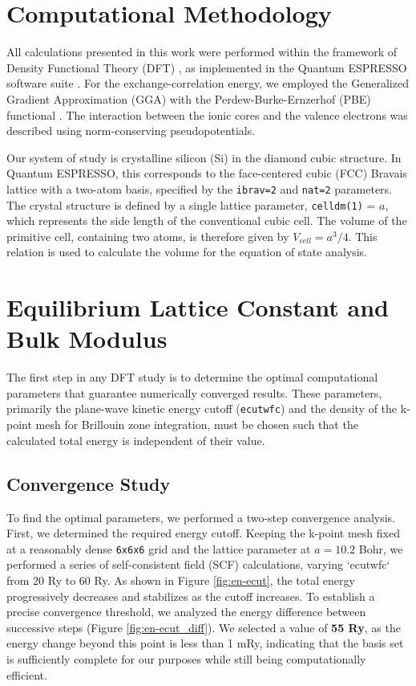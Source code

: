 \documentclass{article}
\begin{document}
\section{Computational Methodology}

All calculations presented in this work were performed within the framework of Density Functional Theory (DFT) \cite{hohenberg_kohn_1964, kohn_sham_1965}, as implemented in the Quantum ESPRESSO software suite \cite{qe_2009, qe_2017}. For the exchange-correlation energy, we employed the Generalized Gradient Approximation (GGA) with the Perdew-Burke-Ernzerhof (PBE) functional \cite{pbe_1996}. The interaction between the ionic cores and the valence electrons was described using norm-conserving pseudopotentials.

Our system of study is crystalline silicon (Si) in the diamond cubic structure. In Quantum ESPRESSO, this corresponds to the face-centered cubic (FCC) Bravais lattice with a two-atom basis, specified by the \verb|ibrav=2| and \verb|nat=2| parameters. The crystal structure is defined by a single lattice parameter, \verb|celldm(1)| = $a$, which represents the side length of the conventional cubic cell. The volume of the primitive cell, containing two atoms, is therefore given by $V_{cell} = a^3/4$. This relation is used to calculate the volume for the equation of state analysis.

\section{Equilibrium Lattice Constant and Bulk Modulus}

The first step in any DFT study is to determine the optimal computational parameters that guarantee numerically converged results. These parameters, primarily the plane-wave kinetic energy cutoff (\verb|ecutwfc|) and the density of the k-point mesh for Brillouin zone integration, must be chosen such that the calculated total energy is independent of their value.

\subsection{Convergence Study}

To find the optimal parameters, we performed a two-step convergence analysis.
First, we determined the required energy cutoff. Keeping the k-point mesh fixed at a reasonably dense \verb|6x6x6| grid and the lattice parameter at $a=10.2$ Bohr, we performed a series of self-consistent field (SCF) calculations, varying `ecutwfc` from $20$ Ry to $60$ Ry. As shown in Figure \ref{fig:en-ecut}, the total energy progressively decreases and stabilizes as the cutoff increases. To establish a precise convergence threshold, we analyzed the energy difference between successive steps (Figure \ref{fig:en-ecut_diff}). We selected a value of \textbf{55 Ry}, as the energy change beyond this point is less than 1 mRy, indicating that the basis set is sufficiently complete for our purposes while still being computationally efficient.
\end{document}
